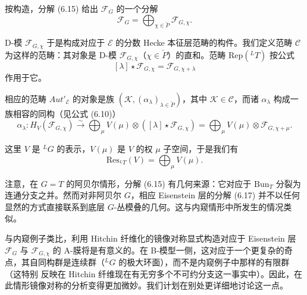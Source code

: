 \documentclass[11pt,a4paper]{article}
\newcommand{\Bun}{\mathrm{Bun}}
\begin{document}
按构造，分解 (6.15) 给出 $\mathcal{F}_G$ 的一个分解
\begin{equation}\tag{6.17}
\mathcal{F}_G = \bigoplus_{\chi\in\check{P}}\mathcal{F}_{G,\chi}.
\end{equation}

D-模 $\mathcal{F}_{G,\chi}$ 于是构成对应于 $\mathcal{E}$ 的分数 Hecke 本征层范畴的构件。我们定义范畴 $\mathcal{C}$ 为这样的范畴：其对象是 D-模 $\mathcal{F}_{G,\chi}$（$\chi\in\check{P}$）的直和。范畴 $\mathrm{Rep}({}^LT)$ 按公式
\[
[\lambda]\star\mathcal{F}_{G,\chi} = \mathcal{F}_{G,\chi+\lambda}
\]
作用于它。

相应的范畴 $Aut'_{\mathcal{E}}$ 的对象是族 $(\mathcal{K},(\alpha_\lambda)_{\lambda\in\check{P}})$，其中 $\mathcal{K}\in\mathcal{C}$，而诸 $\alpha_\lambda$ 构成一族相容的同构（见公式 (6.10)）
\[
\alpha_\lambda : H_V(\mathcal{F}_{G,\chi})\xrightarrow{\sim}\bigoplus_\mu V(\mu)\otimes([\lambda]\star\mathcal{F}_{G,\chi}) = \bigoplus_\mu V(\mu)\otimes\mathcal{F}_{G,\chi+\mu}.
\]


这里 $V$ 是 ${}^LG$ 的表示，$V(\mu)$ 是 $V$ 的权 $\mu$ 子空间，于是我们有
\[
\mathrm{Res}_{{}^LT}(V) = \bigoplus_\mu V(\mu).
\]

注意，在 $G = T$ 的阿贝尔情形，分解 (6.15) 有几何来源：它对应于 $\Bun_T$ 分裂为连通分支之并。然而对非阿贝尔 $G$，相应 Eisenstein 层的分解 (6.17) 并不以任何显然的方式直接联系到底层 $G$-丛模叠的几何。这与内窥情形中所发生的情况类似。

与内窥例子类比，利用 Hitchin 纤维化的镜像对称显式构造对应于 Eisenstein 层 $\mathcal{F}_G$ 与 $\mathcal{F}_{G,\chi}$ 的 A-膜将是有意义的。在 B-模型一侧，这对应于一个更复杂的奇点，其自同构群是连续群（${}^LG$ 的极大环面），而不是内窥例子中那样的有限群（这特别
反映在 Hitchin 纤维现在有无穷多个不可约分支这一事实中）。因此，在此情形镜像对称的分析变得更加微妙。我们计划在别处更详细地讨论这一点。


\end{document}
